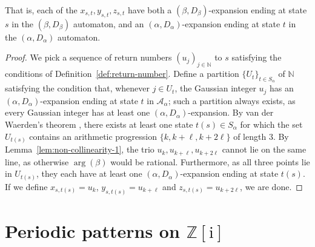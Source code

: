 \documentclass{amsart}
\newcommand{\N}{\mathbb{N}}
\newcommand{\Z}{\mathbb{Z}}
\newcommand{\tcr}{\textcolor{red}}
\newcommand{\ii}{\mathrm{i}}
\newtheorem*{main theorem}{Theorem \ref{thm:main-gaussian}}
\theoremstyle{definition}
\begin{document}
     That is, each of the $x_{s,t},y_{s,t},z_{s,t}$ have both a $(\beta, D_\beta)$-expansion ending at state $s$ in the $(\beta , D_\beta)$ automaton, and an $(\alpha, D_\alpha)$-expansion ending at state $t$ in the $(\alpha, D_\alpha)$ automaton.


\begin{proof}
    
    We pick a sequence of return numbers  $(u_j)_{j\in\N}$ to $s$ satisfying the  conditions of Definition~\ref{def:return-number}. 
    Define a partition $\{U_t\}_{t\in S_\alpha}$ of $\N$ satisfying the condition that, whenever $j\in U_t$, the Gaussian integer $u_j$ has an $(\alpha, D_\alpha)$-expansion ending at state $t$ in $\mathcal{A}_\alpha$; such a partition always exists, as every Gaussian integer has at least one $(\alpha, D_\alpha)$-expansion. By van der Waerden's theorem \cite{vdW}, there exists at least one state $t(s)\in S_\alpha$ for which the set $U_{t(s)}$ contains an arithmetic progression $\{k,k+\ell,k+2\ell\}$ of length $3$. By Lemma~\ref{lem:non-collinearity-1}, the trio $u_k,u_{k+\ell},u_{k+2\ell}$ cannot lie on the same line, as otherwise $\arg(\beta)$ would be rational. Furthermore, as all three points lie in $U_{t(s)}$, they each have at least one $(\alpha , D_\alpha)$-expansion ending at state $t(s)$. If we define $x_{s,t(s)}=u_k$, $y_{s,t(s)}=u_{k+\ell}$ and $z_{s,t(s)}=u_{k+2\ell}$, we are done.

\end{proof}



\section{\texorpdfstring{Periodic patterns on $\Z[\ii]$}{Periodic patterns on $Z[\ii ]$}}\label{sec:periods}
\end{document}
